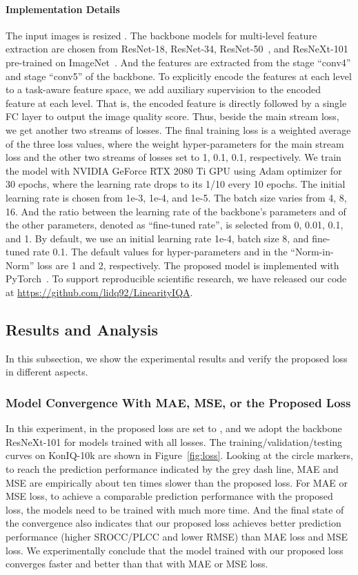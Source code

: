 \documentclass[sigconf]{acmart}
\begin{document}
\paragraph{Implementation Details}
The input images is resized .
The backbone models for multi-level feature extraction are chosen from ResNet-18, ResNet-34, ResNet-50~\cite{he2016deep}, and ResNeXt-101~\cite{xie2017aggregated} pre-trained on ImageNet~\cite{deng2009imagenet}. 
And the features are extracted from the stage ``conv4'' and stage ``conv5'' of the backbone.
To explicitly encode the features at each level to a task-aware feature space, we add auxiliary supervision to the encoded feature at each level. 
That is, the encoded feature is directly followed by a single FC layer to output the image quality score. 
Thus, beside the main stream loss, we get another two streams of losses.
The final training loss is a weighted average of the three loss values, where the weight hyper-parameters for the main stream loss and the other two streams of losses set to 1, 0.1, 0.1, respectively. 
We train the model with NVIDIA GeForce RTX 2080 Ti GPU using Adam optimizer for 30 epochs, where the learning rate drops to its 1/10 every 10 epochs.
The initial learning rate is chosen from 1e-3, 1e-4, and 1e-5.
The batch size varies from 4, 8, 16. 
And the ratio between the learning rate of the backbone's parameters and of the other parameters, denoted as ``fine-tuned rate'', is selected from 0, 0.01, 0.1, and 1.
By default, we use an initial learning rate 1e-4, batch size 8, and fine-tuned rate 0.1.
The default values for hyper-parameters  and  in the ``Norm-in-Norm'' loss are 1 and 2, respectively.
The proposed model is implemented with PyTorch~\cite{paszke2019pytorch}.
To support reproducible scientific research, we have released our code at \url{https://github.com/lidq92/LinearityIQA}.

\subsection{Results and Analysis}
In this subsection, we show the experimental results and verify the proposed loss in different aspects. 

\subsubsection{Model Convergence With MAE, MSE, or the Proposed Loss}
\label{sec:loss-exp}
In this experiment,  in the proposed loss are set to , and we adopt the backbone ResNeXt-101 for models trained with all losses. 
The training/validation/testing curves on KonIQ-10k are shown in Figure~\ref{fig:loss}. 
Looking at the circle markers, to reach the prediction performance indicated by the grey dash line, MAE and MSE are empirically about ten times slower than the proposed loss.  
For MAE or MSE loss, to achieve a comparable prediction performance with the proposed loss, the models need to be trained with much more time.
And the final state of the convergence also indicates that our proposed loss achieves better prediction performance (higher SROCC/PLCC and lower RMSE) than MAE loss and MSE loss.
We experimentally conclude that the model trained with our proposed loss converges faster and better than that with MAE or MSE loss.
\end{document}
